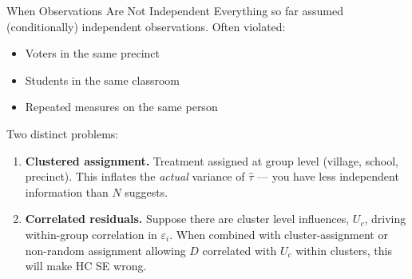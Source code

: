 \documentclass[xcolor=dvipsnames]{beamer}
\renewcommand{\epsilon}{\varepsilon}
\begin{document}
\begin{frame}{When Observations Are Not Independent}
\small
{} Everything so far assumed (conditionally) independent observations.  Often violated:
\begin{itemize}
\footnotesize
\item Voters in the same precinct
\item Students in the same classroom
\item Repeated measures on the same person
\end{itemize}

\medskip
{} Two distinct problems:\\[4pt]
\begin{enumerate}
\item<2-> \textbf{Clustered assignment.}  Treatment assigned at group level (village, school, precinct).  This inflates the \textit{actual} variance of $\hat\tau$ --- you have less independent information than $N$ suggests.
\medskip
\item<3-> \textbf{Correlated residuals.}  Suppose there are cluster level influences, $U_c$, driving within-group correlation in $\epsilon_i$. When combined with cluster-assignment or non-random assignment allowing $D$ correlated with $U_c$ within clusters, this will make HC SE wrong. 
\end{enumerate}

\end{frame}
\end{document}
